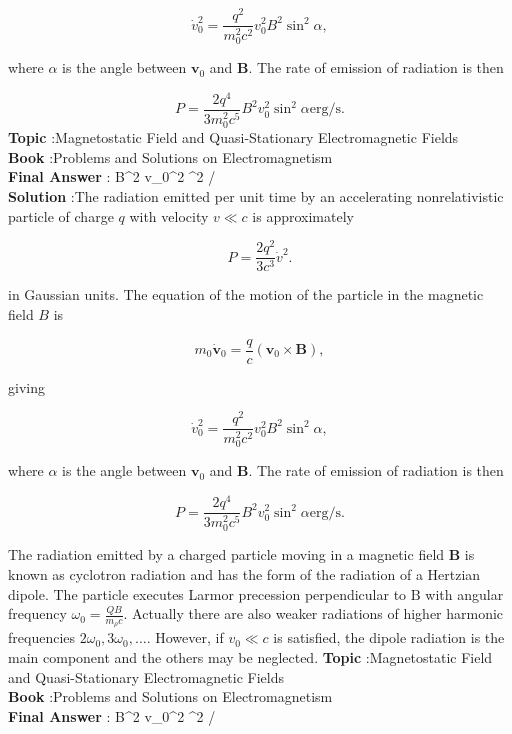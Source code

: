 \documentclass[10pt]{article}
\begin{document}
$$
\dot{v}_{0}^{2}=\frac{q^{2}}{m_{0}^{2} c^{2}} v_{0}^{2} B^{2} \sin ^{2} \alpha,
$$

where $\alpha$ is the angle between $\mathbf{v}_{0}$ and $\mathbf{B}$. The rate of emission of radiation is then

$$
P=\frac{2 q^{4}}{3 m_{0}^{2} c^{5}} B^{2} v_{0}^{2} \sin ^{2} \alpha \mathrm{erg} / \mathrm{s} .
$$
\textbf{Topic} :Magnetostatic Field and Quasi-Stationary Electromagnetic Fields\\
\textbf{Book} :Problems and Solutions on Electromagnetism\\
\textbf{Final Answer} : B^{2} v_{0}^{2} \sin ^{2} \alpha {} / \\


\textbf{Solution} :The radiation emitted per unit time by an accelerating nonrelativistic particle of charge $q$ with velocity $v \ll c$ is approximately

$$
P=\frac{2 q^{2}}{3 c^{3}} \dot{v}^{2} .
$$

in Gaussian units. The equation of the motion of the particle in the magnetic field $B$ is

$$
m_{0} \dot{\mathbf{v}}_{0}=\frac{q}{c}\left(\mathbf{v}_{0} \times \mathbf{B}\right),
$$

giving

$$
\dot{v}_{0}^{2}=\frac{q^{2}}{m_{0}^{2} c^{2}} v_{0}^{2} B^{2} \sin ^{2} \alpha,
$$

where $\alpha$ is the angle between $\mathbf{v}_{0}$ and $\mathbf{B}$. The rate of emission of radiation is then

$$
P=\frac{2 q^{4}}{3 m_{0}^{2} c^{5}} B^{2} v_{0}^{2} \sin ^{2} \alpha \mathrm{erg} / \mathrm{s} .
$$

 The radiation emitted by a charged particle moving in a magnetic field $\mathbf{B}$ is known as cyclotron radiation and has the form of the radiation of a Hertzian dipole. The particle executes Larmor precession perpendicular to $\mathrm{B}$ with angular frequency $\omega_{0}=\frac{Q B}{m_{\rho} c}$. Actually there are also weaker radiations of higher harmonic frequencies $2 \omega_{0}, 3 \omega_{0}, \ldots$. However, if $v_{0} \ll c$ is satisfied, the dipole radiation is the main component and the others may be neglected.
\textbf{Topic} :Magnetostatic Field and Quasi-Stationary Electromagnetic Fields\\
\textbf{Book} :Problems and Solutions on Electromagnetism\\
\textbf{Final Answer} : B^{2} v_{0}^{2} \sin ^{2} \alpha {} / \\
\end{document}
